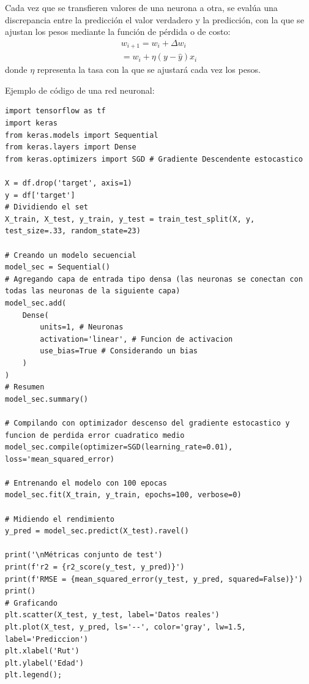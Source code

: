 \documentclass[a4paper, 12pt]{book}
\begin{document}
Cada vez que se transfieren valores de una neurona a otra, se evalúa una discrepancia entre la predicción el valor verdadero y la predicción, con la que se ajustan los pesos mediante la función de pérdida o de costo:
\begin{gather}
	w_{i+1}= w_{i}+ \Delta w_{i} \\
	= w_{i}+ \eta (y - \hat{y})x_{i}
\end{gather}
donde $\eta$ representa la tasa con la que se ajustará cada vez los pesos.

Ejemplo de código de una red neuronal:
\begin{verbatim}
import tensorflow as tf
import keras
from keras.models import Sequential
from keras.layers import Dense
from keras.optimizers import SGD # Gradiente Descendente estocastico

X = df.drop('target', axis=1)
y = df['target']
# Dividiendo el set
X_train, X_test, y_train, y_test = train_test_split(X, y, test_size=.33, random_state=23)

# Creando un modelo secuencial
model_sec = Sequential()
# Agregando capa de entrada tipo densa (las neuronas se conectan con todas las neuronas de la siguiente capa)
model_sec.add(
	Dense(
		units=1, # Neuronas
		activation='linear', # Funcion de activacion
		use_bias=True # Considerando un bias
	)
)
# Resumen
model_sec.summary()

# Compilando con optimizador descenso del gradiente estocastico y funcion de perdida error cuadratico medio 
model_sec.compile(optimizer=SGD(learning_rate=0.01), loss='mean_squared_error)

# Entrenando el modelo con 100 epocas
model_sec.fit(X_train, y_train, epochs=100, verbose=0)

# Midiendo el rendimiento
y_pred = model_sec.predict(X_test).ravel()

print('\nMétricas conjunto de test')
print(f'r2 = {r2_score(y_test, y_pred)}')
print(f'RMSE = {mean_squared_error(y_test, y_pred, squared=False)}')
print()
# Graficando
plt.scatter(X_test, y_test, label='Datos reales')
plt.plot(X_test, y_pred, ls='--', color='gray', lw=1.5, label='Prediccion')
plt.xlabel('Rut')
plt.ylabel('Edad')
plt.legend();
\end{verbatim}


\newpage
\end{document}

